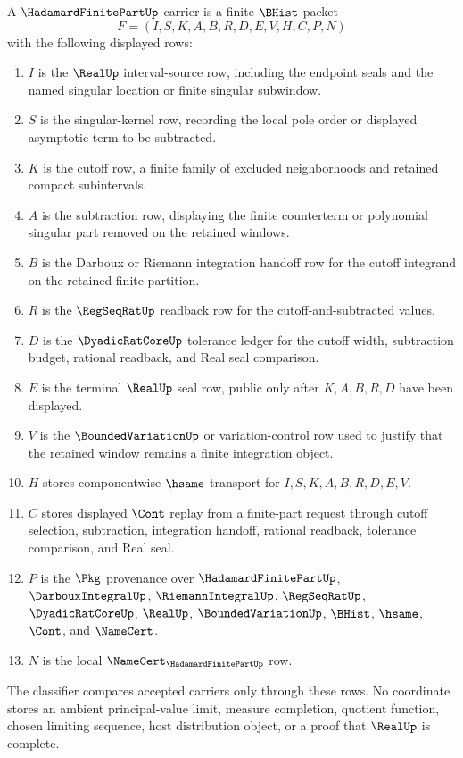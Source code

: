 \begin{definition}
\label{def:hadamard-finite-part-carrier}
A $\HadamardFinitePartUp$ carrier is a finite $\BHist$ packet
$$
F=(I,S,K,A,B,R,D,E,V,H,C,P,N)
$$
with the following displayed rows:
\begin{enumerate}
\item $I$ is the $\RealUp$ interval-source row, including the endpoint seals and the named singular location or finite singular subwindow.
\item $S$ is the singular-kernel row, recording the local pole order or displayed asymptotic term to be subtracted.
\item $K$ is the cutoff row, a finite family of excluded neighborhoods and retained compact subintervals.
\item $A$ is the subtraction row, displaying the finite counterterm or polynomial singular part removed on the retained windows.
\item $B$ is the Darboux or Riemann integration handoff row for the cutoff integrand on the retained finite partition.
\item $R$ is the $\RegSeqRatUp$ readback row for the cutoff-and-subtracted values.
\item $D$ is the $\DyadicRatCoreUp$ tolerance ledger for the cutoff width, subtraction budget, rational readback, and Real seal comparison.
\item $E$ is the terminal $\RealUp$ seal row, public only after $K,A,B,R,D$ have been displayed.
\item $V$ is the $\BoundedVariationUp$ or variation-control row used to justify that the retained window remains a finite integration object.
\item $H$ stores componentwise $\hsame$ transport for $I,S,K,A,B,R,D,E,V$.
\item $C$ stores displayed $\Cont$ replay from a finite-part request through cutoff selection, subtraction, integration handoff, rational readback, tolerance comparison, and Real seal.
\item $P$ is the $\Pkg$ provenance over $\HadamardFinitePartUp$, $\DarbouxIntegralUp$, $\RiemannIntegralUp$, $\RegSeqRatUp$, $\DyadicRatCoreUp$, $\RealUp$, $\BoundedVariationUp$, $\BHist$, $\hsame$, $\Cont$, and $\NameCert$.
\item $N$ is the local $\NameCert_{\HadamardFinitePartUp}$ row.
\end{enumerate}
The classifier compares accepted carriers only through these rows. No coordinate stores an ambient principal-value limit, measure completion, quotient function, chosen limiting sequence, host distribution object, or a proof that $\RealUp$ is complete.
\end{definition}

